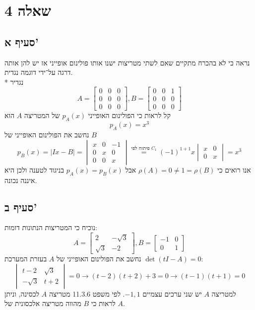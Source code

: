 \documentclass[a4paper,10pt]{article}
\begin{document}
\section{שאלה 4}
\subsection{סעיף א'}
נראה כי לא בהכרח מתקיים שאם לשתי מטריצות ישנו אותו פולינום אופייני אז יש להן אותה דרגה על־ידי דוגמה נגדית. \\*
נגדיר
\[
	A = \begin{bmatrix}
		0 & 0 & 0 \\
		0 & 0 & 0 \\
		0 & 0 & 0
	\end{bmatrix},
	B = \begin{bmatrix}
		0 & 0 & 1 \\
		0 & 0 & 0 \\
		0 & 0 & 0
	\end{bmatrix}
\]
קל לראות כי הפולינום האופייני $p_A(x)$ של המטריצה $A$ הוא
\[
	p_A(x) = x^3
\]
נחשב את הפולינום האופייני של $B$
\[
	p_B(x) = |Ix - B|
	= \begin{vmatrix}
		x & 0 & -1 \\
		0 & x & 0 \\
		0 & 0 & x
	\end{vmatrix}
	\overset{\text{פיתוח לפי $C_1$}}{=}
	{(-1)}^{1+1} x \begin{vmatrix}
		x & 0 \\
		0 & x
	\end{vmatrix}
	= x^3
\]
אנו רואים כי $\rho(A) = 0 \ne 1 = \rho(B)$ אבל $p_A(x) = p_B(x)$ בניגוד לטענה ולכן היא איננה נכונה.

\subsection{סעיף ב'}
נוכיח כי המטריצות הנתונות דומות:
\[
	A =
	\begin{bmatrix}
		2 & -\sqrt{3} \\
		\sqrt{3} & -2
	\end{bmatrix},
	B =
	\begin{bmatrix}
		-1 & 0 \\
		0 & 1
	\end{bmatrix}
\]
נחשב את הפולינום האופייני של $A$ בעזרת המערכת $\det(tI - A) = 0$:
\[
	\begin{vmatrix}
		t - 2 & \sqrt{3} \\
		- \sqrt{3} & t + 2
	\end{vmatrix} = 0
	\rightarrow
	(t - 2)(t + 2) + 3 = 0
	\rightarrow
	(t - 1)(t + 1) = 0
\]
למטריצה $A$ יש שני ערכים עצמיים $-1, 1$.
לפי משפט 11.3.6 מטריצה $A$ לכסינה,
וניתן לראות כי $B$ מהווה מטריצה אלכסונית של $A$.
\end{document}
